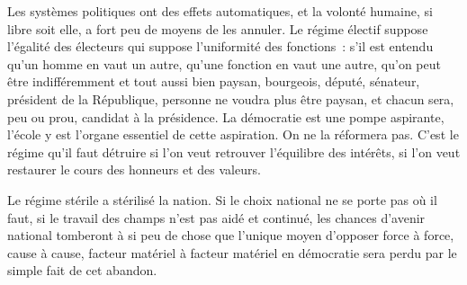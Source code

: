 \documentclass[french,twoside]{book} %
\newcommand{\astermono}{\medskip\centerline{\color{rubric}\large\selectfont{\syms ✻}}\medskip\par}%
\begin{document}
\astermono

\noindent Les systèmes politiques ont des effets automatiques, et la volonté humaine, si libre soit elle, a fort peu de moyens de les annuler. Le régime électif suppose l’égalité des électeurs qui suppose l’uniformité des fonctions : s’il est entendu qu’un homme en vaut un autre, qu’une fonction en vaut une autre, qu’on peut être indifféremment et tout aussi bien paysan, bourgeois, député, sénateur, président de la République, personne ne voudra plus être paysan, et chacun sera, peu ou prou, candidat à la présidence. La démocratie est une pompe aspirante, l’école y est l’organe essentiel de cette aspiration. On ne la réformera pas. C’est le régime qu’il faut détruire si l’on veut retrouver l’équilibre des intérêts, si l’on veut restaurer le cours des honneurs et des valeurs.\par

\astermono

\noindent Le régime stérile a stérilisé la nation. Si le choix national ne se porte pas où il faut, si le travail des champs n’est pas aidé et continué, les chances d’avenir national tomberont à si peu de chose que l’unique moyen d’opposer force à force, cause à cause, facteur matériel à facteur matériel en démocratie sera perdu par le simple fait de cet abandon.\par

\astermono
\end{document}
